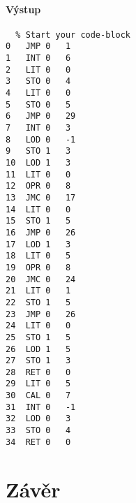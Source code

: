 \documentclass{style}
\begin{document}
\subsubsection{Výstup}

\begin{lstlisting}  % Start your code-block
0	JMP	0	1
1	INT	0	6
2	LIT	0	0
3	STO	0	4
4	LIT	0	0
5	STO	0	5
6	JMP	0	29
7	INT	0	3
8	LOD	0	-1
9	STO	1	3
10	LOD	1	3
11	LIT	0	0
12	OPR	0	8
13	JMC	0	17
14	LIT	0	0
15	STO	1	5
16	JMP	0	26
17	LOD	1	3
18	LIT	0	5
19	OPR	0	8
20	JMC	0	24
21	LIT	0	1
22	STO	1	5
23	JMP	0	26
24	LIT	0	0
25	STO	1	5
26	LOD	1	5
27	STO	1	3
28	RET	0	0
29	LIT	0	5
30	CAL	0	7
31	INT	0	-1
32	LOD	0	3
33	STO	0	4
34	RET	0	0
\end{lstlisting}

\chapter{Závěr}
\end{document}
